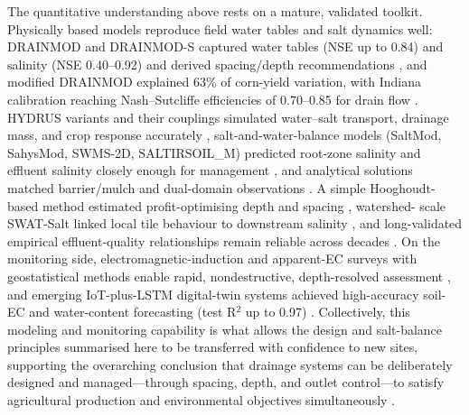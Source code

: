 \documentclass[11pt]{article}
\begin{document}
The quantitative understanding above rests on a mature, validated toolkit.
Physically based models reproduce field water tables and salt dynamics well:
DRAINMOD and DRAINMOD-S captured water tables (NSE up to 0.84) and salinity (NSE
0.40--0.92) and derived spacing/depth recommendations
\parencite{Chen2025,Tian2023,Tian2023c,Tian2024,Davoodi2019,Li2024}, and modified
DRAINMOD explained 63\% of corn-yield variation, with Indiana calibration reaching
Nash--Sutcliffe efficiencies of 0.70--0.85 for drain flow
\parencite{HARDJOAMIDJOJO1982,Ale2009,Wang2006b,DeBoer2006}. HYDRUS variants and
their couplings simulated water--salt transport, drainage mass, and crop response
accurately \parencite{Li2023,Dou2022,Wang2024c,Li2026,Jia2023,Liu2022,Feng2019,Feng2021},
salt-and-water-balance models (SaltMod, SahysMod, SWMS-2D, SALTIRSOIL\_M) predicted
root-zone salinity and effluent salinity closely enough for management
\parencite{Bahçeci2006,Bahçeci2007,Yao2017,Qian2021b,Abdelkrim2021}, and analytical
solutions matched barrier/mulch and dual-domain observations
\parencite{KAMRA1991,KAMRA1994,Zhang2022,Zhang2024,Youngs2000}. A simple
Hooghoudt-based method estimated profit-optimising depth and spacing
\parencite{Skaggs2006,HOOGHOUDT1952,KARAJEH1994,KARAJEH1994b,Sands2015}, watershed-
scale SWAT-Salt linked local tile behaviour to downstream salinity
\parencite{Addab2022,Liu2026,ElAgha2020}, and long-validated empirical
effluent-quality relationships remain reliable across decades
\parencite{JOHNSTON1993,Kelleners2000}. On the monitoring side,
electromagnetic-induction and apparent-EC surveys with geostatistical methods
enable rapid, nondestructive, depth-resolved assessment
\parencite{Narjary2024,Song2023,Yu2025,Singh2020d,Mirlas2003,Gates2002}, and
emerging IoT-plus-LSTM digital-twin systems achieved high-accuracy soil-EC and
water-content forecasting (test R$^2$ up to 0.97) \parencite{Qin2025}.
Collectively, this modeling and monitoring capability is what allows the design
and salt-balance principles summarised here to be transferred with confidence to
new sites, supporting the overarching conclusion that drainage systems can be
deliberately designed and managed---through spacing, depth, and outlet
control---to satisfy agricultural production and environmental objectives
simultaneously \parencite{Skaggs1995,Breve1998,ElSadek2002b,Strock2011,Ritzema2016,Blann2009,Gramlich2018,FAUSEY1995,SKAGGS1994}.

\printbibliography
\end{document}
